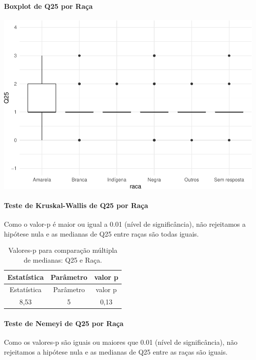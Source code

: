 \documentclass[]{article}
\let\oldparagraph\paragraph
\renewcommand{\paragraph}[1]{\oldparagraph{#1}\mbox{}}
\begin{document}
\hypertarget{boxplot-de-q25-por-rauxe7a}{%
\paragraph{Boxplot de Q25 por Raça}\label{boxplot-de-q25-por-rauxe7a}}

\begin{center}\includegraphics[width=0.75\linewidth]{relatorio_covid19_files/figure-latex/unnamed-chunk-696-1} \end{center}

\hypertarget{teste-de-kruskal-wallis-de-q25-por-rauxe7a}{%
\paragraph{Teste de Kruskal-Wallis de Q25 por Raça}\label{teste-de-kruskal-wallis-de-q25-por-rauxe7a}}

Como o valor-p é maior ou igual a 0.01 (nível de significância), não rejeitamos a hipótese nula e as medianas de Q25 entre raças são todas iguais.

\begin{longtable}[]{@{}ccc@{}}
\caption{\label{tab:unnamed-chunk-698}Valores-p para comparação múltipla de medianas: Q25 e Raça.}\tabularnewline
\toprule
Estatística & Parâmetro & valor p\tabularnewline
\midrule
\endfirsthead
\toprule
Estatística & Parâmetro & valor p\tabularnewline
\midrule
\endhead
8,53 & 5 & 0,13\tabularnewline
\bottomrule
\end{longtable}

\hypertarget{teste-de-nemeyi-de-q25-por-rauxe7a}{%
\paragraph{Teste de Nemeyi de Q25 por Raça}\label{teste-de-nemeyi-de-q25-por-rauxe7a}}

Como os valores-p são iguais ou maiores que 0.01 (nível de significância), não rejeitamos a hipótese nula e as medianas de Q25 entre as raças são iguais.
\end{document}
